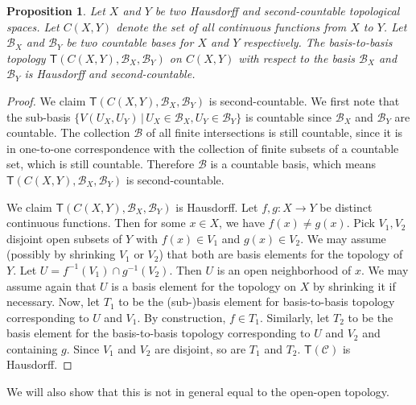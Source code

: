 \documentclass[review]{elsarticle}
\theoremstyle{plain}%
\newtheorem{prop}[thm]{Proposition}
\theoremstyle{definition}
\theoremstyle{remark}
\begin{document}
\begin{prop}
	Let $X$ and $Y$ be two Hausdorff and second-countable topological spaces. Let $C(X,Y)$ denote the set of all continuous functions from $X$ to $Y$. Let $\mathcal{B}_X$ and $\mathcal{B}_Y$ be two countable bases for $X$ and $Y$ respectively. The basis-to-basis topology $\mathsf{T}(C(X,Y), \mathcal{B}_X, \mathcal{B}_Y)$ on $C(X,Y)$ with respect to the basis $\mathcal{B}_X$ and $\mathcal{B}_Y$ is Hausdorff and second-countable. 
\end{prop}
\begin{proof}
	We claim $\mathsf{T}(C(X,Y), \mathcal{B}_X, \mathcal{B}_Y)$ is second-countable. We first note that the sub-basis $\{V(U_X, U_Y) \, |\,   U_X \in \mathcal{B}_X , U_Y \in \mathcal{B}_Y \}$ is countable since $\mathcal{B}_X$ and $\mathcal{B}_Y$ are countable. The collection $\mathcal{B}$ of all finite intersections is still countable, since it is in one-to-one correspondence with the collection of finite subsets of a countable set, which is still countable. Therefore $\mathcal{B}$ is a countable basis, which means $\mathsf{T}(C(X,Y), \mathcal{B}_X, \mathcal{B}_Y)$ is second-countable.
	
	We claim $\mathsf{T}(C(X,Y), \mathcal{B}_X, \mathcal{B}_Y)$ is Hausdorff. Let $f,g:X\to Y$ be distinct continuous functions. Then for some $x\in X$, we have $f(x)\neq g(x)$. Pick $V_1, V_2$ disjoint open subsets of $Y$ with $f(x)\in V_1$ and $g(x)\in V_2$. We may assume (possibly by shrinking $V_1$ or $V_2$) that both are basis elements for the topology of $Y$. Let $U=f^{-1}(V_1)\cap g^{-1}(V_2)$. Then $U$ is an open neighborhood of $x$. We may assume again that $U$ is a basis element for the topology on $X$ by shrinking it if necessary. Now, let $T_1$ to be the (sub-)basis element for basis-to-basis topology corresponding to $U$ and $V_1$. By construction, $f\in T_1$. Similarly, let $T_2$ to be the basis element for the basis-to-basis topology corresponding to $U$ and $V_2$ and containing $g$. Since $V_1$ and $V_2$ are disjoint, so are $T_1$ and $T_2$. $\mathsf{T}(\mathcal{C})$ is Hausdorff.
\end{proof}

We will also show that this is not in general equal to the open-open topology. 
\end{document}
